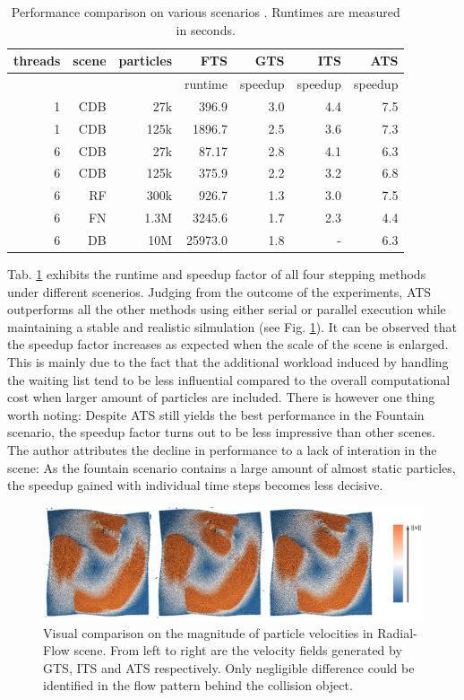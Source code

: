 \documentclass[
	11pt, 
	DIV10,
	ngerman,
	a4paper, 
	oneside, 
	headings=normal, 
	captions=tableheading,
	final, 
	numbers=noenddot
]{scrartcl}
\begin{document}
\begin{table}[tb]
	\centering
	\begin{tabular}{|r|r|r|r|r|r|r|}
		\hline
		threads & scene & particles & FTS & GTS & ITS & ATS \\
		\hline
		& & & runtime & speedup & speedup & speedup \\
		\hline	
		1 & CDB & 27k & 396.9 & 3.0 & 4.4 & 7.5 \\
		1 & CDB & 125k & 1896.7 & 2.5 & 3.6 & 7.3 \\
		6 & CDB & 27k & 87.17 & 2.8 & 4.1 & 6.3 \\
		6 & CDB & 125k & 375.9 & 2.2 & 3.2 & 6.8 \\
		6 & RF & 300k & 926.7 & 1.3 & 3.0 & 7.5 \\
		6 & FN & 1.3M & 3245.6 & 1.7 & 2.3 & 4.4 \\
		6 & DB & 10M & 25973.0 & 1.8 & - & 6.3 \\
		\hline
	\end{tabular}
	\caption{\label{tab1} Performance comparison on various scenarios \cite{reinhardt2017fully}. Runtimes are measured in seconds.}
\end{table}

Tab. \ref{tab1} exhibits the runtime and speedup factor of all four stepping methods under different scenerios. Judging from the outcome of the experiments, ATS outperforms all the other methods using either serial or parallel execution while maintaining a stable and realistic silmulation (see Fig. \ref{fig7}). It can be observed that the speedup factor increases as expected when the scale of the scene is enlarged. This is mainly due to the fact that the additional workload induced by handling the waiting list tend to be less influential compared to the overall computational cost when larger amount of particles are included. There is however one thing worth noting: Despite ATS still yields the best performance in the Fountain scenario, the speedup factor turns out to be less impressive than other scenes. The author attributes the decline in performance to a lack of interation in the scene: As the fountain scenario contains a large amount of almost static particles, the speedup gained with individual time steps becomes less decisive.

\begin{figure}[tb]
	\centering
	\includegraphics[scale=0.26]{images/2}
	\caption{\label{fig7} Visual comparison on the magnitude of particle velocities in Radial-Flow scene\cite{reinhardt2017fully}. From left to right are the velocity fields generated by GTS, ITS and ATS respectively. Only negligible difference could be identified in the flow pattern behind the collision object.}
\end{figure}
\end{document}
